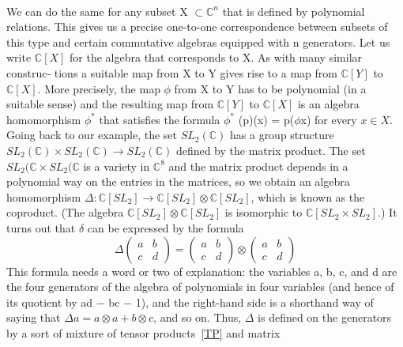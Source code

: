 \documentclass[preprint, 5p, 10pt]{elsarticle}
\theoremstyle{plain}
\begin{document}
\paragraph{}\phantom{xxx}We can do the same for any subset X $\subset \mathbb{C}^{n}$ that
is defined by polynomial relations. This gives us a
precise one-to-one correspondence between subsets of
this type and certain commutative algebras equipped
with n generators. Let us write $\mathbb{C}[X]$ for the algebra
that corresponds to X. As with many similar construc-
tions a suitable map from X to Y gives
rise to a map from $\mathbb{C}[Y ]$ to $\mathbb{C}[X]$. More precisely, the
map $\phi$ from X to Y has to be polynomial (in a suitable
sense) and the resulting map from $\mathbb{C}[Y ]$ to $\mathbb{C}[X]$ is an
algebra homomorphism $\phi^{*}$ that satisfies the formula
$\phi^{*}$ (p)(x) = p($\phi$x) for every $x \in X$.
Going back to our example, the set $SL_{2 }(\mathbb{C})$ has a group
structure $SL_{2 }(\mathbb{C}) \times SL_{2}(\mathbb{C}) \rightarrow SL_{2} (\mathbb{C})$ defined by the
matrix product. The set $SL_{2}(\mathbb{C} \times SL_{2}(\mathbb{C}$ is a variety in
$\mathbb{C}^{8}$ and the matrix product depends in a polynomial way
on the entries in the matrices, so we obtain an algebra
homomorphism $\Delta : \mathbb{C}[SL_{2} ] → \mathbb{C}[SL_{2} ] \otimes \mathbb{C}[SL_{2} ]$, which is
known as the coproduct. (The algebra $\mathbb{C}[SL_{2} ] \otimes \mathbb{C}[SL_{2} ]$
is isomorphic to $\mathbb{C}[SL_{2} \times SL_{2} ].$) It turns out that $\delta$ can
be expressed by the formula
\begin{displaymath}
\Delta \begin{pmatrix} a & b \\ c & d \end{pmatrix} = \begin{pmatrix} a & b \\ c & d \end{pmatrix}
\otimes \begin{pmatrix} a & b \\ c & d \end{pmatrix}
\end{displaymath}
This formula needs a word or two of explanation: the
variables a, b, c, and d are the four generators of the
algebra of polynomials in four variables (and hence of
its quotient by ad − bc − 1), and the right-hand side
is a shorthand way of saying that $\Delta a = a \otimes a + b \otimes c$,
and so on. Thus, $\Delta$ is defined on the generators by a
sort of mixture of tensor products~\ref{TP} and matrix
\end{document}
